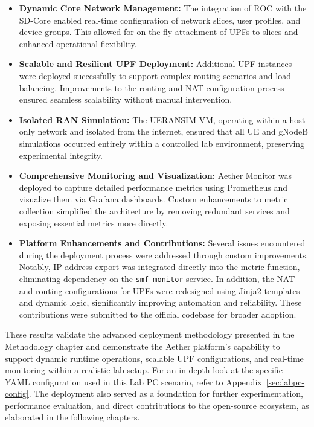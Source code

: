 \begin{itemize}
    \item \textbf{Dynamic Core Network Management:}  
    The integration of ROC with the SD-Core enabled real-time configuration of network slices, user profiles, and device groups. This allowed for on-the-fly attachment of UPFs to slices and enhanced operational flexibility.
    
    \item \textbf{Scalable and Resilient UPF Deployment:}  
    Additional UPF instances were deployed successfully to support complex routing scenarios and load balancing. Improvements to the routing and NAT configuration process ensured seamless scalability without manual intervention.
    
    \item \textbf{Isolated RAN Simulation:}  
    The UERANSIM VM, operating within a host-only network and isolated from the internet, ensured that all UE and gNodeB simulations occurred entirely within a controlled lab environment, preserving experimental integrity.
    
    \item \textbf{Comprehensive Monitoring and Visualization:}  
    Aether Monitor was deployed to capture detailed performance metrics using Prometheus and visualize them via Grafana dashboards. Custom enhancements to metric collection simplified the architecture by removing redundant services and exposing essential metrics more directly.
    
    \item \textbf{Platform Enhancements and Contributions:}  
    Several issues encountered during the deployment process were addressed through custom improvements. Notably, IP address export was integrated directly into the metric function, eliminating dependency on the \texttt{smf-monitor} service. In addition, the NAT and routing configurations for UPFs were redesigned using Jinja2 templates and dynamic logic, significantly improving automation and reliability. These contributions were submitted to the official codebase for broader adoption.
\end{itemize}

These results validate the advanced deployment methodology presented in the 
Methodology chapter and demonstrate the Aether platform’s capability to support 
dynamic runtime operations, scalable UPF configurations, and real-time monitoring 
within a realistic lab setup. For an in-depth look at the specific YAML configuration 
used in this Lab PC scenario, refer to Appendix~\ref{sec:labpc-config}. The deployment 
also served as a foundation for further experimentation, performance evaluation, and 
direct contributions to the open-source ecosystem, as elaborated in the following chapters.

